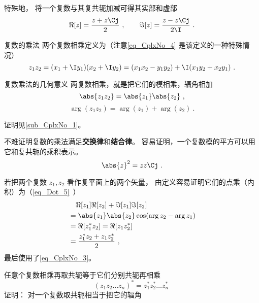特殊地， 将一个复数与其复共轭加减可得其实部和虚部
\begin{equation}\label{eq_CplxNo_3}
\Re[z] = \frac{z + z\Cj}{2} ~,\qquad
\Im[z] = \frac{z - z\Cj}{2\I}~.
\end{equation}

\begin{definition}{复数的乘法}
两个复数相乘定义为（注意\autoref{eq_CplxNo_4} 是该定义的一种特殊情况）
\begin{equation}
z_1z_2 = (x_1 + \I y_1)(x_2 + \I y_2) = (x_1 x_2 - y_1 y_2) + \I (x_1 y_2 + x_2 y_1)~.
\end{equation}
\end{definition}

\begin{theorem}{复数乘法的几何意义}\label{the_CplxNo_2}
两复数相乘，就是把它们的模相乘，辐角相加
\begin{equation}\label{eq_CplxNo_10}
\abs{z_1 z_2} = \abs{z_1}\abs{z_2}~,
\end{equation}
\begin{equation}
\arg(z_1 z_2) = \arg(z_1) + \arg(z_2)~.
\end{equation}
\end{theorem}
证明见\autoref{sub_CplxNo_1}。

不难证明复数的乘法满足\textbf{交换律}和\textbf{结合律}。 容易证明，一个复数模的平方可以用它和复共轭的乘积表示。
\begin{equation}\label{eq_CplxNo_2}
\abs{z}^2 = z z\Cj~.
\end{equation}

若把两个复数 $z_1, z_2$ 看作复平面上的两个矢量， 由定义容易证明它们的点乘（内积）为（\autoref{eq_Dot_5}~）
\begin{equation}\label{eq_CplxNo_11}
\begin{aligned}
&\quad \Re[z_1] \Re[z_2] + \Im[z_1]\Im[z_2]\\
&= \abs{z_1}\abs{z_2}\cos(\arg z_2 - \arg z_1)\\
&= \Re[z_1^* z_2] = \Re[z_1 z_2^*]\\
&= \frac{z_1^* z_2 + z_1 z_2^*}{2}~,
\end{aligned}
\end{equation}
最后使用了\autoref{eq_CplxNo_3}。

任意个复数相乘再取共轭等于它们分别共轭再相乘
\begin{equation}
(z_1z_2\dots z_n)^* = z_1^*z_2^*\dots z_n^*~
\end{equation}
证明： 对一个复数取共轭相当于把它的辐角

